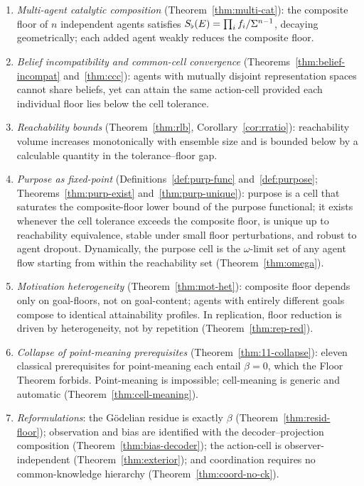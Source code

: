 \begin{enumerate}[label=(\arabic*),leftmargin=*]
\item \emph{Multi-agent catalytic composition}
(Theorem~\ref{thm:multi-cat}): the composite floor of $n$ independent
agents satisfies $S_{\flat}(E)=\prod_if_i/\Sigma^{n-1}$, decaying
geometrically; each added agent weakly reduces the composite floor.
\item \emph{Belief incompatibility and common-cell convergence}
(Theorems~\ref{thm:belief-incompat} and~\ref{thm:ccc}): agents with
mutually disjoint representation spaces cannot share beliefs, yet can
attain the same action-cell provided each individual floor lies below the
cell tolerance.
\item \emph{Reachability bounds} (Theorem~\ref{thm:rlb},
Corollary~\ref{cor:rratio}): reachability volume increases monotonically
with ensemble size and is bounded below by a calculable quantity in the
tolerance--floor gap.
\item \emph{Purpose as fixed-point} (Definitions~\ref{def:purp-func}
and~\ref{def:purpose}; Theorems~\ref{thm:purp-exist} and~\ref{thm:purp-unique}):
purpose is a cell that saturates the composite-floor lower bound of the
purpose functional; it exists whenever the cell tolerance exceeds the
composite floor, is unique up to reachability equivalence, stable under
small floor perturbations, and robust to agent dropout. Dynamically, the
purpose cell is the $\omega$-limit set of any agent flow starting from
within the reachability set (Theorem~\ref{thm:omega}).
\item \emph{Motivation heterogeneity} (Theorem~\ref{thm:mot-het}): composite
floor depends only on goal-floors, not on goal-content; agents with
entirely different goals compose to identical attainability profiles. In
replication, floor reduction is driven by heterogeneity, not by repetition
(Theorem~\ref{thm:rep-red}).
\item \emph{Collapse of point-meaning prerequisites}
(Theorem~\ref{thm:11-collapse}): eleven classical prerequisites for
point-meaning each entail $\beta=0$, which the Floor Theorem forbids.
Point-meaning is impossible; cell-meaning is generic and automatic
(Theorem~\ref{thm:cell-meaning}).
\item \emph{Reformulations}: the Gödelian residue is exactly $\beta$
(Theorem~\ref{thm:resid-floor}); observation and bias are identified with
the decoder--projection composition (Theorem~\ref{thm:bias-decoder}); the
action-cell is observer-independent (Theorem~\ref{thm:exterior}); and
coordination requires no common-knowledge hierarchy
(Theorem~\ref{thm:coord-no-ck}).
\end{enumerate}

